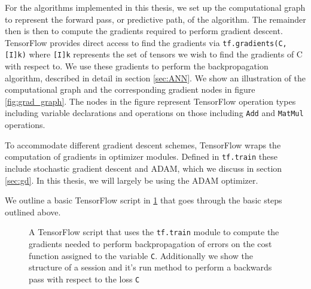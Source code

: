 For the algorithms implemented in this thesis, we set up the computational graph to represent the forward pass, or predictive path, of the algorithm. The remainder then is then to compute the gradients required to perform gradient descent. TensorFlow provides direct access to find the gradients via \lstinline{tf.gradients(C, [I]k)} where \lstinline{[I]k} represents the set of tensors we wish to find the gradients of C with respect to. We use these gradients to perform the backpropagation algorithm, described in detail in section \ref{sec:ANN}. We show an illustration of the computational graph and the corresponding gradient nodes in figure \ref{fig:grad_graph}. The nodes in the figure represent TensorFlow operation types including variable declarations and operations on those including \lstinline{Add} and \lstinline{MatMul} operations.

To accommodate different gradient descent schemes, TensorFlow wraps the computation of gradients in optimizer modules. Defined in \lstinline{tf.train} these include stochastic gradient descent and ADAM, which we discuss in section \ref{sec:gd}. In this thesis, we will largely be using the ADAM optimizer.

We outline a basic TensorFlow script in \ref{code:tf_script} that goes through the basic steps outlined above.

\begin{figure}
\centering 
\begin{minipage}[c]{\linewidth}

\end{minipage}
\caption[Computing gradients and performing back-propagation in TensorFlow]{A TensorFlow script that uses the \lstinline{tf.train} module to compute the gradients needed to perform backpropagation of errors on the cost function assigned to the variable \lstinline{C}. Additionally we show the structure of a session and it's run method to perform a backwards pass with respect to the loss \lstinline{C}}\label{code:tf_script}
\end{figure}